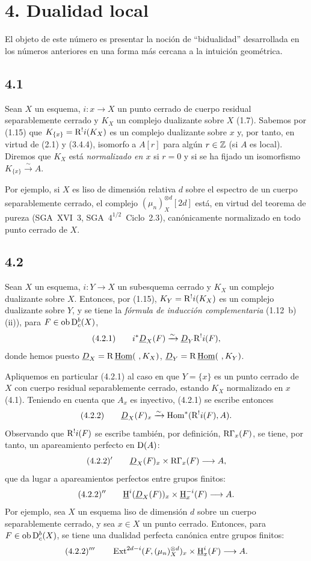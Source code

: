 \section*{4. Dualidad local}

El objeto de este número es presentar la noción de ``bidualidad'' desarrollada en los números anteriores en una forma más cercana a la intuición geométrica.

\subsection*{4.1}
Sean $X$ un esquema, $i : x \to X$ un punto cerrado de cuerpo residual separablemente cerrado y $K_X$ un complejo dualizante sobre $X$ (1.7). Sabemos por (1.15) que $K_{\{x\}} = \mathrm{R}^{!}i(K_X)$ es un complejo dualizante sobre $x$ y, por tanto, en virtud de (2.1) y (3.4.4), isomorfo a $A[r]$ para algún $r \in \mathbb{Z}$ (si $A$ es local). Diremos que $K_X$ está \emph{normalizado en $x$} si $r = 0$ y si se ha fijado un isomorfismo $K_{\{x\}} \xrightarrow{\sim} A$.

Por ejemplo, si $X$ es liso de dimensión relativa $d$ sobre el espectro de un cuerpo separablemente cerrado, el complejo $(\mu_n)_X^{\otimes d}[2d]$ está, en virtud del teorema de pureza (SGA~XVI~3, SGA~$4^{1/2}$~Ciclo~2.3), canónicamente normalizado en todo punto cerrado de $X$.

\subsection*{4.2}
Sean $X$ un esquema, $i : Y \to X$ un subesquema cerrado y $K_X$ un complejo dualizante sobre $X$. Entonces, por (1.15), $K_Y = \mathrm{R}^{!}i(K_X)$ es un complejo dualizante sobre $Y$, y se tiene la \emph{fórmula de inducción complementaria} (1.12~b)(ii)), para $F \in \operatorname{ob} \mathrm{D}_c^b(X)$,
\[
(4.2.1)\qquad i^*\underline{D}_X(F)\xrightarrow{\sim}\underline{D}_Y\mathrm{R}^{!}i(F),
\]
donde hemos puesto $\underline{D}_X = \mathrm{R}\,\underline{\operatorname{Hom}}(\ ,K_X)$, $\underline{D}_Y = \R\,\underline{\Hom}(\ ,K_Y)$.

Apliquemos en particular (4.2.1) al caso en que $Y = \{x\}$ es un punto cerrado de $X$ con cuerpo residual separablemente cerrado, estando $K_X$ normalizado en $x$ (4.1). Teniendo en cuenta que $A_x$ es inyectivo, (4.2.1) se escribe entonces
\[
(4.2.2)\qquad \underline{D}_X(F)_x\xrightarrow{\sim}\operatorname{Hom}^*(\mathrm{R}^{!}i(F),A).
\]
Observando que $\mathrm{R}^{!}i(F)$ se escribe también, por definición, $\mathrm{R}\Gamma_x(F)$, se tiene, por tanto, un apareamiento perfecto en $\mathrm{D}(A)$:
\[
(4.2.2)'\qquad \underline{D}_X(F)_x\times \mathrm{R}\Gamma_x(F)\longrightarrow A,
\]
que da lugar a apareamientos perfectos entre grupos finitos:
\[
(4.2.2)''\qquad \underline{\mathrm H}^i(\underline{D}_X(F))_x\times \underline{\mathrm H}_x^{-i}(F)\longrightarrow A.
\]
Por ejemplo, sea $X$ un esquema liso de dimensión $d$ sobre un cuerpo separablemente cerrado, y sea $x \in X$ un punto cerrado. Entonces, para $F \in \operatorname{ob} \mathrm{D}_c^b(X)$, se tiene una dualidad perfecta canónica entre grupos finitos:
\[
(4.2.2)'''\qquad \operatorname{Ext}^{2d-i}(F,(\mu_n)_X^{\otimes d})_x\times \underline{\mathrm H}_x^i(F)\longrightarrow A.
\]

